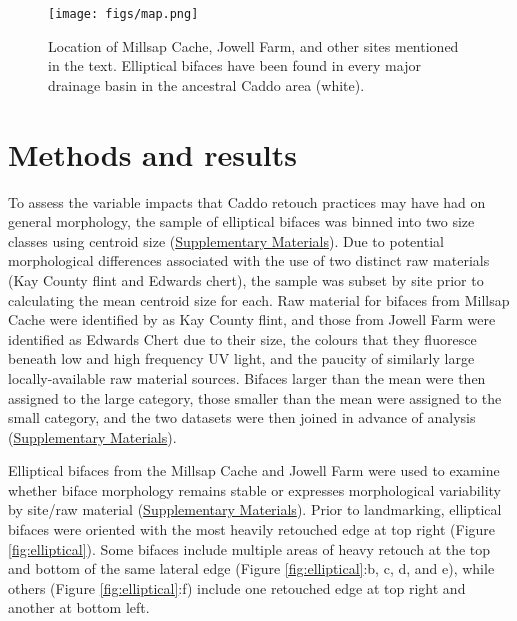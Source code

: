\documentclass[]{interact}
\theoremstyle{plain}%
\theoremstyle{definition}
\theoremstyle{remark}
\begin{document}
\begin{figure}\centering
\texttt{[image: figs/map.png]}
\caption{Location of Millsap Cache, Jowell Farm, and other sites mentioned in the text. Elliptical bifaces have been found in every major drainage basin in the ancestral Caddo area (white).}
\label{fig:map}
\end{figure}

\hypertarget{methods-and-results}{%
\section{Methods and results}\label{methods-and-results}}

To assess the variable impacts that Caddo retouch practices may have had
on general morphology, the sample of elliptical bifaces was binned into
two size classes using centroid size
(\href{https://seldenlab.github.io/elliptical.bifaces/}{Supplementary
Materials}). Due to potential morphological differences associated with
the use of two distinct raw materials (Kay County flint and Edwards
chert), the sample was subset by site prior to calculating the mean
centroid size for each. Raw material for bifaces from Millsap Cache were
identified by \citet{RN11461} as Kay County flint, and those from Jowell
Farm were identified as Edwards Chert due to their size, the colours
that they fluoresce beneath low and high frequency UV light, and the
paucity of similarly large locally-available raw material sources.
Bifaces larger than the mean were then assigned to the large category,
those smaller than the mean were assigned to the small category, and the
two datasets were then joined in advance of analysis
(\href{https://seldenlab.github.io/elliptical.bifaces/}{Supplementary
Materials}).

Elliptical bifaces from the Millsap Cache and Jowell Farm were used to
examine whether biface morphology remains stable or expresses
morphological variability by site/raw material
(\href{https://seldenlab.github.io/elliptical.bifaces/gm---siteraw-material.html}{Supplementary
Materials}). Prior to landmarking, elliptical bifaces were oriented with
the most heavily retouched edge at top right (Figure
\ref{fig:elliptical}). Some bifaces include multiple areas of heavy
retouch at the top and bottom of the same lateral edge (Figure
\ref{fig:elliptical}:b, c, d, and e), while others (Figure
\ref{fig:elliptical}:f) include one retouched edge at top right and
another at bottom left.
\end{document}
